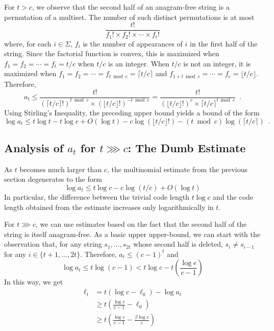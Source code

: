 \documentclass{patmorin}
\newcommand{\ceil}[1]{\lceil #1\rceil}
\newcommand{\floor}[1]{\lfloor #1\rfloor}
\begin{document}
For $t>c$, we observe that the second half of an anagram-free string is a permutation of a multiset.  The number of such distinct permutations is at most
\[
    \frac{t!}{f_1!\times f_2!\times \cdots\times f_t!}
\]
where, for each $i\in\Sigma$, $f_i$ is the number of appearances of $i$ in the first half of the string.  Since the factorial function is convex, this is maximized when $f_1=f_2=\cdots=f_t=t/c$ when $t/c$ is an integer.  When $t/c$ is not an integer, it is maximized when $f_1=f_2=\cdots=f_{t\bmod c}=\ceil{t/c}$ and $f_{1+t\bmod c}=\cdots=f_c=\floor{t/c}$.  Therefore,
\[
    a_t \le \frac{t!}{(\ceil{t/c}!)^{t\bmod c}\times (\floor{t/c}!)^{-t\bmod c}}
    = \frac{t!}{(\floor{t/c}!)^c\times \ceil{t/c}^{t\bmod c}} \enspace .
\]
Using Stirling's Inequality, the preceding upper bound yields a bound of the form
\[
   \log a_t \le t\log t - t\log e + O(\log t) - c\log(\floor{t/c}!) - (t\bmod c)\log(\ceil{t/c}) \enspace .
\]

\subsection{Analysis of $a_t$ for $t\ggg c$: The Dumb Estimate}

As $t$ becomes much larger than $c$, the multinomial estimate from the previous section degenerates to the form
\[
   \log a_t \le t\log c - c\log(t/c) + O(\log t)
\]
In particular, the difference between the trivial code length $t\log c$ and the code length obtained from the estimate increases only logarithmically in $t$.

For $t\ggg c$, we can use estimates based on the fact that the second half of the string is itself anagram-free.  As a basic upper upper-bound, we can start with the observation that, for any string $s_1,\ldots,s_{2t}$ whose second half is deleted, $s_{i}\neq s_{i-1}$ for any $i\in\{t+1,\ldots,2t\}$.  Therefore,
$a_t \le (c-1)^t$ and
\[
     \log a_t \le t\log(c-1) < t\log c - t\left(\frac{\log e}{c-1}\right)
\]
In this way, we get
\begin{align*}
    \ell_t & = t(\log c - \ell_0) - \log a_t \\
        & \ge t\left(\frac{\log e}{c-1}-\ell_0\right) \\
        & \ge t\left(\frac{\log e}{c-1}-\frac{\beta\log c}{c}\right) 
\end{align*}
\end{document}
